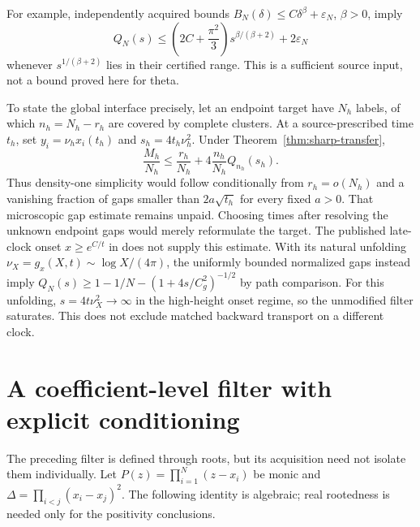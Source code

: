 For example, independently acquired bounds
$B_N(\delta)\le C\delta^\beta+\varepsilon_N$, $\beta>0$, imply
\[
 Q_N(s)\le\left(2C+\frac{\pi^2}{3}\right)s^{\beta/(\beta+2)}
             +2\varepsilon_N
\]
whenever $s^{1/(\beta+2)}$ lies in their certified range. This is a sufficient
source input, not a bound proved here for theta.

To state the global interface precisely, let an endpoint target have $N_h$
labels, of which $n_h=N_h-r_h$ are covered by complete clusters. At a
source-prescribed time $t_h$, set $y_i=\nu_hx_i(t_h)$ and
$s_h=4t_h\nu_h^2$. Under Theorem~\ref{thm:sharp-transfer},
\begin{equation}
 \frac{M_h}{N_h}\le\frac{r_h}{N_h}
       +4\frac{n_h}{N_h}Q_{n_h}(s_h).
 \label{eq:global-spectral-interface}
\end{equation}
Thus density-one simplicity would follow conditionally from $r_h=o(N_h)$
and a vanishing fraction of gaps smaller than $2a\sqrt{t_h}$ for every fixed
$a>0$. That microscopic gap estimate remains unpaid. Choosing times after
resolving the unknown endpoint gaps would merely reformulate the target.
The published late-clock onset $x\ge e^{C/t}$ in \cite{polymath} does not
supply this estimate. With its natural unfolding
$\nu_X=g_x(X,t)\sim\log X/(4\pi)$, the uniformly bounded normalized gaps
instead imply $Q_N(s)\ge1-1/N-(1+4s/C_g^2)^{-1/2}$ by path comparison.
For this unfolding, $s=4t\nu_X^2\to\infty$ in the high-height onset regime,
so the unmodified filter saturates. This does not exclude
matched backward transport on a different clock.

\section{A coefficient-level filter with explicit conditioning}
\label{sec:forest-filter}

The preceding filter is defined through roots, but its acquisition need not
isolate them individually. Let $P(z)=\prod_{i=1}^N(z-x_i)$ be monic and
$\Delta=\prod_{i<j}(x_i-x_j)^2$. The following identity is algebraic; real
rootedness is needed only for the positivity conclusions.


